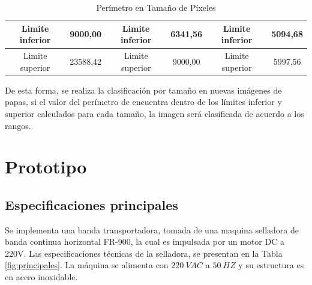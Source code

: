 \begin{table}[ht]
\begin{tabular}{cccccc}
		\multicolumn{1}{|c|}{Limite inferior}   & \multicolumn{1}{c|}{9000,00}              & \multicolumn{1}{c|}{Limite inferior}   & \multicolumn{1}{c|}{6341,56}              & \multicolumn{1}{c|}{Limite inferior}   & \multicolumn{1}{c|}{5094,68}              \\ \hline
		\multicolumn{1}{|c|}{Limite superior}   & \multicolumn{1}{c|}{23588,42}             & \multicolumn{1}{c|}{Limite superior}   & \multicolumn{1}{c|}{9000,00}              & \multicolumn{1}{c|}{Limite superior}   & \multicolumn{1}{c|}{5997,56}              \\ \hline                           
	\end{tabular}
	\caption{Perímetro en Tamaño de Píxeles}
	\label{table:perimetro}
\end{table}

De esta forma, se realiza la clasificación por tamaño en nuevas imágenes de papas, si el valor del perímetro de encuentra dentro de los límites inferior y superior calculados para cada tamaño, la imagen será clasificada de acuerdo a los rangos.


\newpage
\chapter{Prototipo}

\section{Especificaciones principales}
Se implementa una banda transportadora, tomada de una maquina selladora de banda continua horizontal FR-900, la cual es impulsada por un motor DC a 220V. Las especificaciones técnicas de la selladora, se presentan en la Tabla \ref{fig:principales}. La máquina se alimenta con $220 \ VAC$ a $50 \ HZ$ y su estructura es en acero inoxidable. 

